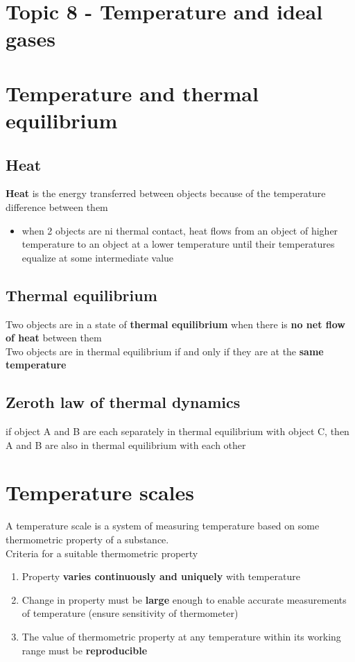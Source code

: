 \documentclass[a4paper, 10pt]{article}
\begin{document}
\section*{Topic 8 - Temperature and ideal gases}


\section{Temperature and thermal equilibrium}

\subsection{Heat}
\begin{framed}
\textbf{Heat} is the energy transferred between objects because of the temperature difference between them
\end{framed}	
\begin{itemize}
   \item when 2 objects are ni thermal contact, heat flows from an object of higher temperature to an object at a lower temperature until their temperatures equalize at some intermediate value
\end{itemize}	

\subsection{Thermal equilibrium}
\begin{framed}
   Two objects are in a state of \textbf{thermal equilibrium} when there is \textbf{no net flow of heat} between them  \\
   Two objects are in thermal equilibrium if and only if they are at the \textbf{same temperature}
\end{framed}	

\subsection{Zeroth law of thermal dynamics}
\begin{framed}
   if object A and B are each separately in thermal equilibrium with object C, then A and B are also in thermal equilibrium with each other
\end{framed}	

\section{Temperature scales}
A temperature scale is a system of measuring temperature based on some thermometric property of a substance. \\
Criteria for a suitable thermometric property
\begin{enumerate}
   \item Property \textbf{varies continuously and uniquely} with temperature
   \item Change in property must be \textbf{large} enough to enable accurate measurements of temperature (ensure sensitivity of thermometer)
   \item The value of thermometric property at any temperature within its working range must be \textbf{reproducible}
\end{enumerate}	
\end{document}
